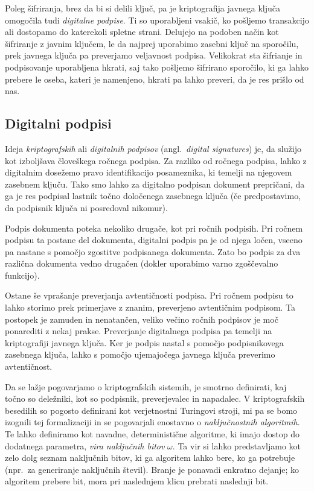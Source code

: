 \documentclass[isrm2, tisk]{fmfdelo}
\begin{document}
Poleg šifriranja, brez da bi si delili ključ, pa je kriptografija javnega ključa omogočila tudi
\textit{digitalne podpise}. Ti so uporabljeni vsakič, ko pošljemo transakcijo ali dostopamo do katerekoli
spletne strani. Delujejo na podoben način kot šifriranje z javnim ključem, le da najprej uporabimo
zasebni ključ na sporočilu, prek javnega ključa pa preverjamo veljavnost podpisa. Velikokrat sta šifrianje
in podpisovanje uporabljena hkrati, saj tako pošljemo šifrirano sporočilo, ki ga lahko prebere le oseba,
kateri je namenjeno, hkrati pa lahko preveri, da je res prišlo od nas.

\subsection{Digitalni podpisi}
Ideja \textit{kriptografskih} ali \textit{digitalnih podpisov} (angl.\ \textit{digital signatures}) je,
da služijo kot izboljšava človeškega ročnega podpisa. Za razliko od ročnega podpisa, lahko z digitalnim
dosežemo pravo identifikacijo posameznika, ki temelji na njegovem zasebnem ključu. Tako smo lahko
za digitalno podpisan dokument prepričani, da ga je res podpisal lastnik točno določenega zasebnega ključa
(če predpostavimo, da podpisnik ključa ni posredoval nikomur).

Podpis dokumenta poteka nekoliko drugače, kot pri ročnih podpisih. Pri ročnem podpisu ta postane del
dokumenta, digitalni podpis pa je od njega ločen, vseeno pa nastane s pomočjo zgostitve podpisanega
dokumenta. Zato bo podpis za dva različna dokumenta vedno drugačen (dokler uporabimo varno zgoščevalno
funkcijo).

Ostane še vprašanje preverjanja avtentičnosti podpisa. Pri ročnem podpisu to lahko storimo prek 
primerjave z znanim, preverjeno avtentičnim podpisom. Ta postopek je zamuden in nenatančen, veliko 
večino ročnih podpisov je moč ponarediti z nekaj prakse. Preverjanje digitalnega podpisa pa temelji 
na kriptografiji javnega ključa. Ker je podpis nastal s pomočjo podpisnikovega zasebnega ključa,
lahko s pomočjo ujemajočega javnega ključa preverimo avtentičnost.

Da se lažje pogovarjamo o kriptografskih sistemih, je smotrno definirati, kaj točno so deležniki,
kot so podpisnik, preverjevalec in napadalec. V kriptografskih besedilih so pogosto definirani kot
verjetnostni Turingovi stroji, mi pa se bomo izognili tej formalizaciji in se pogovarjali enostavno
o \textit{naključnostnih algoritmih}. Te lahko definiramo kot navadne, deterministične algoritme,
ki imajo dostop do dodatnega parametra, \textit{vira naključnih bitov} $\omega$. Ta vir si lahko
predstavljamo kot zelo dolg seznam naključnih bitov, ki ga algoritem lahko bere, ko ga potrebuje
(npr.\ za generiranje naključnih števil). Branje je ponavadi enkratno dejanje; ko algoritem prebere
bit, mora pri naslednjem klicu prebrati naslednji bit.
\end{document}
